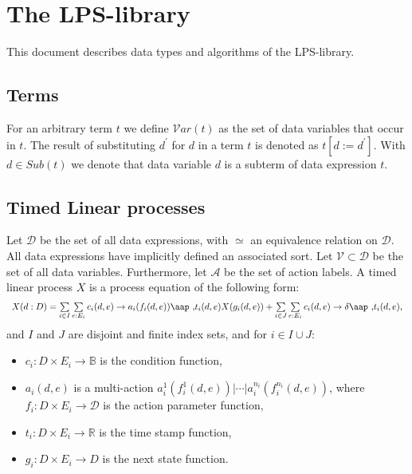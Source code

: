 \documentclass{article}
\begin{document}
\section{The LPS-library}

This document describes data types and algorithms of the LPS-library.

\subsection{Terms}

For an arbitrary term $t$ we define $\mathcal{V}ar(t)$ as the set of data
variables that occur in $t$. The result of substituting $d^{\prime }$ for $d$
in a term $t$ is denoted as $t[d:=d^{\prime }]$. With $d\in Sub(t)$ we
denote that data variable $d$ is a subterm of data expression $t$.

\subsection{Timed Linear processes}

Let $\mathcal{D}$ be the set of all data expressions, with $\simeq $ an
equivalence relation on $\mathcal{D}$. All data expressions have implicitly
defined an associated sort. Let $\mathcal{V\subset D}$ be the set of all
data variables. Furthermore, let $\mathcal{A}$ be the set of action labels.
A timed linear process $X$ is a process equation of the following form:%
\begin{equation}
\begin{array}{l}
X(d:D)=\sum\limits_{i\in I}\sum\limits_{e:E_{i}}c_{i}(d,e)\rightarrow
a_{i}(f_{i}(d,e)) \mbox{\aap ,} t_{i}(d,e)X(g_{i}(d,e))+\sum\limits_{i\in
J}\sum\limits_{e:E_{i}}c_{i}(d,e)\rightarrow \delta \mbox{\aap ,} t_{i}(d,e),%
\end{array}
\label{eq:lps_timed}
\end{equation}%
and $I$ and $J$ are disjoint and finite index sets, and for $i\in I\cup J$:

\begin{itemize}
\item $c_{i}:D\times E_{i}\rightarrow \mathbb{B}$ is the condition function,

\item $a_{i}(d,e)$ is a multi-action $a_{i}^{1}(f_{i}^{1}(d,e))|\cdots
|a_{i}^{n_{i}}(f_{i}^{n_{i}}(d,e))$, where $f_{i}:D\times E_{i}\rightarrow 
\mathcal{D}$ is the action parameter function,

\item $t_{i}:D\times E_{i}\rightarrow \mathbb{R}$ is the time stamp function,

\item $g_{i}:D\times E_{i}\rightarrow D$ is the next state function.
\end{itemize}
\end{document}
